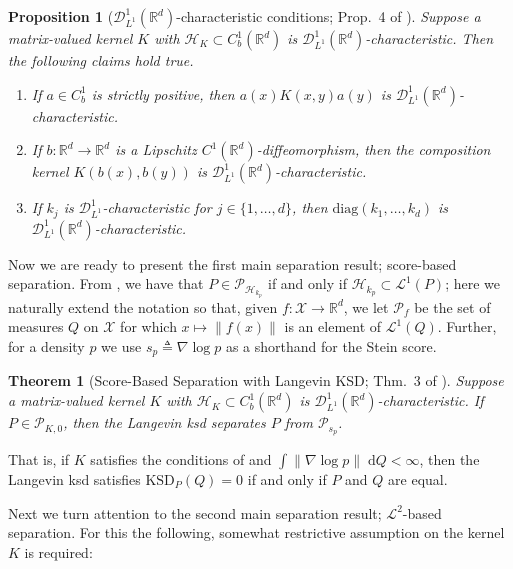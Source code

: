 \documentclass[12pt,paper=letter]{scrreprt}
\newtheorem{theorem}{Theorem}[chapter]
\newtheorem{proposition}{Proposition}[chapter]
\newcommand{\sss}[1]{\scriptscriptstyle{#1}}
\def\R{\mathbb{R}}
\def\defeq{\triangleq} %
\newcommand{\Pset}[0]{\mathcal{P}} %
\renewcommand{\k}{k}
\newcommand{\Kb}{K} %
\newcommand{\embedtozero}[1][\Kb]{\Pset_{\!\sss{#1,0}}}
\def\H{\mathcal{H}}
\newcommand{\Dset}{\mathscr{D}}
\newcommand{\DL}[1]{\Dset^{#1}_{\sss{L^1}}}
\newcommand{\tilt}{a}
\begin{document}
\begin{proposition} [$\DL{1}(\R^d)$-characteristic conditions; Prop.~4 of \citealp{barp2022targeted}]\label{thm:composition-kernel-properties}
Suppose a matrix-valued kernel $K$ with $\H_K \subset C_b^1(\R^d)$ is $\DL{1}(\R^d)$-characteristic.  Then the following claims hold true.
\begin{enumerate}[label=\textup{(\alph*)}]
\item  If $\tilt\in C_b^1$ is strictly positive, then $\tilt( x) K( x,  y)
    \tilt( y)$ is $\DL{1}(\R^d)$-characteristic. 
\item  If $b : \R^d\to\R^d$ is a Lipschitz $C^1(\R^d)$-diffeomorphism, then the composition kernel $K(b( x), b( y))$  
is $\DL{1}(\R^d)$-characteristic.
\item If $\k_j$ is $\DL{1}$-characteristic for $j\in \{1,\dots,d\}$, then  $\mathrm{diag}(\k_1,\ldots, \k_d)$
is $\DL{1}(\R^d)$-characteristic.
\end{enumerate}
\end{proposition}


Now we are ready to present the first main separation result; score-based separation.
From , we have that $P \in \mathcal{P}_{\mathcal{H}_{k_p}}$ if and only if $\mathcal{H}_{k_p} \subset \mathcal{L}^1(P)$; here we naturally extend the notation so that, given $f : \mathcal{X} \rightarrow \mathbb{R}^d$, we let $\mathcal{P}_f$ be the set of measures $Q$ on $\mathcal{X}$ for which $x \mapsto \|f(x)\|$ is an element of $\mathcal{L}^1(Q)$.
Further, for a density $p$ we use $s_p \defeq  \nabla \log p$ as a shorthand for the Stein score.

\begin{theorem}[Score-Based Separation with Langevin KSD; Thm.~3 of \citealp{barp2022targeted}]
\label{coroKSDwc}
Suppose a matrix-valued kernel $K$ with $\H_K \subset C_b^1(\R^d)$ is $\DL{1}(\R^d)$-characteristic.
    If  $P \in \embedtozero$,
    then the Langevin \ac{ksd} separates $P$ from $\Pset_{s_p}$.
\end{theorem}

\noindent That is, if $K$ satisfies the conditions of   and $\int \|\nabla \log p\| \; \mathrm{d}Q < \infty$, then the Langevin \ac{ksd} satisfies $\mathrm{KSD}_P(Q) = 0$ if and only if $P$ and $Q$ are equal.

Next we turn attention to the second main separation result; $\mathcal{L}^2$-based separation.
For this the following, somewhat restrictive assumption on the kernel $K$ is required:
\end{document}
